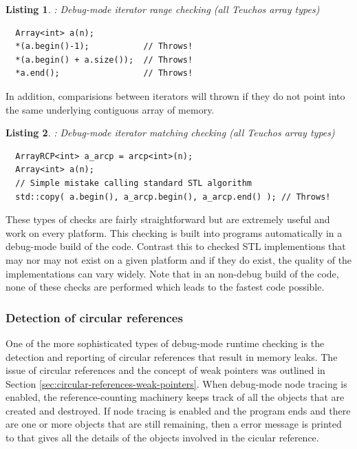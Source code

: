 \documentclass[pdf,ps2pdf,11pt]{SANDreport}
\newtheorem{listing}{Listing}
\begin{document}
{}\begin{listing}: Debug-mode iterator range checking (all Teuchos
array types)
\label{listing:iterator-checking}
{\small\begin{verbatim}
  Array<int> a(n);
  *(a.begin()-1);           // Throws!
  *(a.begin() + a.size());  // Throws!
  *a.end();                 // Throws!
\end{verbatim}}
\end{listing}


In addition, comparisions between iterators will thrown if they do not
point into the same underlying contiguous array of memory.


{}\begin{listing}: Debug-mode iterator matching checking (all Teuchos
array types)
\label{listing:iterator-matching-checking}
{\small\begin{verbatim}
  ArrayRCP<int> a_arcp = arcp<int>(n);
  Array<int> a(n);
  // Simple mistake calling standard STL algorithm
  std::copy( a.begin(), a_arcp.begin(), a_arcp.end() ); // Throws!
\end{verbatim}}
\end{listing}


These types of checks are fairly straightforward but are extremely
useful and work on every platform.  This checking is built into
programs automatically in a debug-mode build of the code.  Contrast
this to checked STL implementions that may nor may not exist on a
given platform and if they do exist, the quality of the
implementations can vary widely.  Note that in an non-debug build of
the code, none of these checks are performed which leads to the
fastest code possible.


%
{}\subsubsection{Detection of circular references}
\label{sec:detection-circular-references}
%

One of the more sophisticated types of debug-mode runtime checking is
the detection and reporting of circular {} references that
result in memory leaks.  The issue of circular references and the
concept of weak pointers was outlined in Section
{}\ref{sec:circular-references-weak-pointers}.  When debug-mode node
tracing is enabled, the reference-counting machinery keeps track of
all the {} objects that are created and destroyed.  If
node tracing is enabled and the program ends and there are one or more
{} objects that are still remaining, then a error message
is printed to {} that gives all the details of the
objects involved in the cicular reference.
\end{document}
